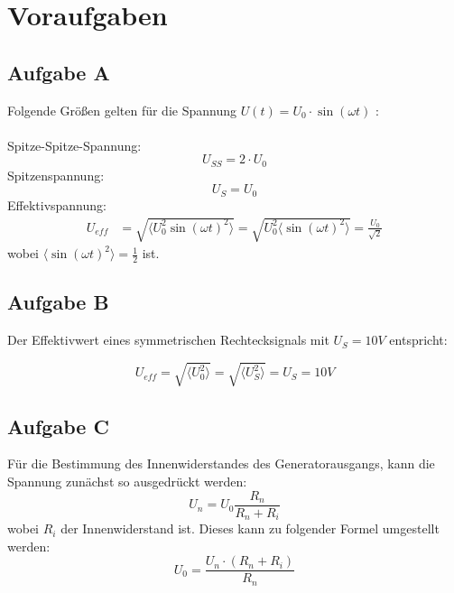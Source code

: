 \documentclass{article}
\begin{document}
\section{Voraufgaben}

\subsection*{Aufgabe A}
Folgende Größen gelten für die Spannung $U(t)= U_0 \cdot \sin{(\omega t)}$ :\\
\\
Spitze-Spitze-Spannung: \begin{equation}
        U_{SS}= 2 \cdot U_0
    \end{equation}
Spitzenspannung: 
    \begin{equation}
        U_{S}= U_0
    \end{equation}
 Effektivspannung:
    \begin{align*}
        U_{eff} &= \sqrt{ \langle U_0 ^2 \sin{(\omega t)}^2 \rangle}
        = \sqrt{ U_0 ^2 \langle \sin{(\omega t)}^2 \rangle} = \frac{U_0}{\sqrt{2}}
    \end{align*}
wobei $\langle \sin{(\omega t)}^2 \rangle = \frac{1}{2}$ ist.



\subsection*{Aufgabe B}
Der Effektivwert eines symmetrischen Rechtecksignals mit $U_S= 10 V$ entspricht:

\begin{equation}
    U_{eff}= \sqrt{\langle U_0 ^2 \rangle}= \sqrt{\langle U_S ^2 \rangle}= U_S = 10V
\end{equation}

\subsection*{Aufgabe C}
Für die Bestimmung des Innenwiderstandes des Generatorausgangs, kann die Spannung zunächst so ausgedrückt werden:
\begin{equation}
\label{Gl 1}
    U_n = U_0 \frac{R_n}{R_n + R_i}
\end{equation}
wobei $R_i$ der Innenwiderstand ist. Dieses kann zu folgender Formel umgestellt werden: 
\begin{equation*}
    U_0 = \frac{U_n \cdot (R_n +R_i)}{R_n}
\end{equation*}
\end{document}
